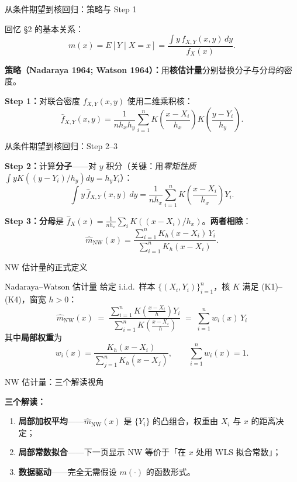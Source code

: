 \documentclass[aspectratio=169, 10pt]{beamer}
\begin{document}
\begin{frame}{从条件期望到核回归：策略与 Step 1}

  回忆 \S2 的基本关系：
  \[
    m(x) = E[Y\mid X=x] = \frac{\int y\, f_{X,Y}(x,y)\, dy}{f_X(x)}.
  \]

  \textbf{策略（Nadaraya 1964; Watson 1964）：}用\textbf{核估计量}分别替换分子与分母的密度。

  \textbf{Step 1：}对联合密度 $f_{X,Y}(x,y)$ 使用二维乘积核：
  \[
    \hat f_{X,Y}(x,y) = \frac{1}{nh_x h_y}\sum_{i=1}^n K\!\left(\frac{x-X_i}{h_x}\right) K\!\left(\frac{y-Y_i}{h_y}\right).
  \]

\end{frame}


\begin{frame}{从条件期望到核回归：Step 2--3}

  \textbf{Step 2：}计算\textbf{分子}——对 $y$ 积分（关键：用\emph{零矩性质} $\int y K((y-Y_i)/h_y)dy = h_y Y_i$）：
  \[
    \int y\, \hat f_{X,Y}(x,y)\, dy = \frac{1}{nh_x}\sum_{i=1}^n K\!\left(\frac{x-X_i}{h_x}\right) Y_i.
  \]

  \textbf{Step 3：}\textbf{分母}是 $\hat f_X(x) = \frac{1}{nh_x}\sum_i K((x-X_i)/h_x)$。\textbf{两者相除}：
  \[
    \boxed{\;\hat m_{\text{NW}}(x) = \dfrac{\displaystyle\sum_{i=1}^n K_h(x-X_i)\, Y_i}{\displaystyle\sum_{i=1}^n K_h(x-X_i)}.\;}
  \]

\end{frame}


\begin{frame}{NW 估计量的正式定义}

  \begin{definitionbox}{Nadaraya--Watson 估计量}
    给定 i.i.d.\ 样本 $\{(X_i, Y_i)\}_{i=1}^n$，核 $K$ 满足 (K1)--(K4)，窗宽 $h>0$：
    \[
      \hat m_{\text{NW}}(x) \;=\; \frac{\sum_{i=1}^n K\!\left(\frac{x-X_i}{h}\right) Y_i}{\sum_{i=1}^n K\!\left(\frac{x-X_i}{h}\right)}
      \;=\; \sum_{i=1}^n w_i(x)\, Y_i
    \]
    其中\textbf{局部权重}为
    \[
      w_i(x) = \frac{K_h(x-X_i)}{\sum_{j=1}^n K_h(x-X_j)},\qquad \sum_{i=1}^n w_i(x) = 1.
    \]
  \end{definitionbox}

\end{frame}


\begin{frame}{NW 估计量：三个解读视角}

  \begin{keybox}
    \textbf{三个解读：}
    \begin{enumerate}
      \item \textbf{局部加权平均}——$\hat m_{\text{NW}}(x)$ 是 $\{Y_i\}$ 的凸组合，权重由 $X_i$ 与 $x$ 的距离决定；
      \item \textbf{局部常数拟合}——下一页显示 NW 等价于「在 $x$ 处用 WLS 拟合常数」；
      \item \textbf{数据驱动}——完全无需假设 $m(\cdot)$ 的函数形式。
    \end{enumerate}
  \end{keybox}

\end{frame}
\end{document}
